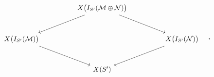 \[
\begin{tikzcd}[column sep=huge,row sep=large]
& X\bigl(I_{S'}(\mathcal M\oplus\mathcal N)\bigr) \arrow[dl] \arrow[dr] & \\
X\bigl(I_{S'}(\mathcal M)\bigr) \arrow[dr] & & X\bigl(I_{S'}(\mathcal N)\bigr) \arrow[dl]\\
& X(S') &
\end{tikzcd}\quad ,
\]
